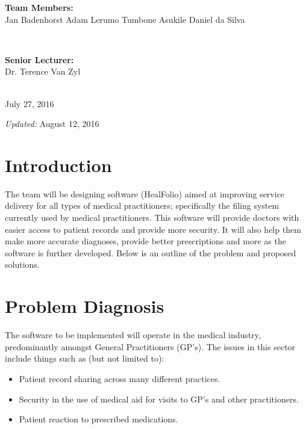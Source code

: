 \documentclass[a4paper]{article}
\begin{document}
\begin{titlepage}
\begin{minipage}{0.4\textwidth}
\begin{flushleft}
\textbf{Team Members:} \\[0.3cm]

Jan Badenhorst
Adam Lerumo
Tumbone Asukile
Daniel da Silva

\end{flushleft}

\end{minipage} \\[0.7cm]

\begin{minipage}{0.4\textwidth}

\begin{flushright} \large

\textbf{Senior Lecturer:} \\[0.3cm]

Dr. Terence Van Zyl

\end{flushright}

\end{minipage} \\[1cm]

{\large July 27, 2016}

{\emph{Updated:} August 12, 2016}
    
\end{titlepage}

\setlength\parindent{24pt}

\section*{Introduction}
	The team will be designing software (HealFolio) aimed at improving service delivery for all types of medical practitioners; specifically the filing system currently used by medical practitioners. This software will provide doctors with easier access to patient records and provide more security. It will also help them make more accurate diagnoses, provide better prescriptions and more as the software is further developed. Below is an outline of the problem and proposed solutions.

\section*{Problem Diagnosis}
	The software to be implemented will operate in the medical industry, predominantly amongst General Practitioners (GP's). The issues in this sector include things such as (but not limited to):
	\begin{itemize}
		\item Patient record sharing across many different practices.
		\item Security in the use of medical aid for visits to GP's and other practitioners.
		\item Patient reaction to prescribed medications.
	\end{itemize}
\end{document}
